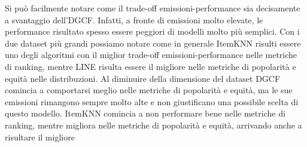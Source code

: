 Si può facilmente notare come il trade-off emissioni-performance sia decisamente a svantaggio dell'DGCF. Infatti, a fronte di emissioni molto elevate, le performance risultato spesso essere peggiori di modelli molto più semplici.
Con i due dataset più grandi possiamo notare come in generale ItemKNN risulti essere uno degli algoritmi con il miglior trade-off emissioni-performance nelle metriche di ranking, mentre LINE risulta essere il migliore nelle metriche di popolarità e equità nelle distribuzioni.
Al diminuire della dimensione del dataset DGCF comincia a comportarsi meglio nelle metriche di popolarità e equità, ma le sue emissioni rimangono sempre molto alte e non giustificano una possibile scelta di questo modello.
ItemKNN comincia a non performare bene nelle metriche di ranking, mentre migliora nelle metriche di popolarità e equità, arrivando anche a risultare il migliore

